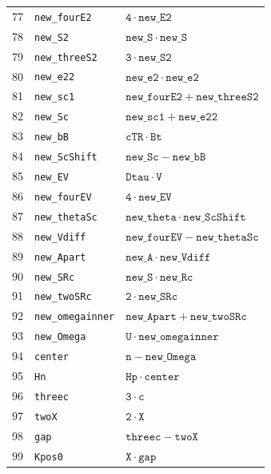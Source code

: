 \documentclass[11pt]{article}
\theoremstyle{remark}
\begin{document}
\begin{longtable}{rll}
77 & \texttt{new\_fourE2} & $\mathtt{4} \mathbin{\cdot} \mathtt{new\_E2}$ \\
78 & \texttt{new\_S2} & $\mathtt{new\_S} \mathbin{\cdot} \mathtt{new\_S}$ \\
79 & \texttt{new\_threeS2} & $\mathtt{3} \mathbin{\cdot} \mathtt{new\_S2}$ \\
80 & \texttt{new\_e22} & $\mathtt{new\_e2} \mathbin{\cdot} \mathtt{new\_e2}$ \\
81 & \texttt{new\_sc1} & $\mathtt{new\_fourE2} + \mathtt{new\_threeS2}$ \\
82 & \texttt{new\_Sc} & $\mathtt{new\_sc1} + \mathtt{new\_e22}$ \\
83 & \texttt{new\_bB} & $\mathtt{cTR} \mathbin{\cdot} \mathtt{Bt}$ \\
84 & \texttt{new\_ScShift} & $\mathtt{new\_Sc} - \mathtt{new\_bB}$ \\
85 & \texttt{new\_EV} & $\mathtt{Dtau} \mathbin{\cdot} \mathtt{V}$ \\
86 & \texttt{new\_fourEV} & $\mathtt{4} \mathbin{\cdot} \mathtt{new\_EV}$ \\
87 & \texttt{new\_thetaSc} & $\mathtt{new\_theta} \mathbin{\cdot} \mathtt{new\_ScShift}$ \\
88 & \texttt{new\_Vdiff} & $\mathtt{new\_fourEV} - \mathtt{new\_thetaSc}$ \\
89 & \texttt{new\_Apart} & $\mathtt{new\_A} \mathbin{\cdot} \mathtt{new\_Vdiff}$ \\
90 & \texttt{new\_SRc} & $\mathtt{new\_S} \mathbin{\cdot} \mathtt{new\_Rc}$ \\
91 & \texttt{new\_twoSRc} & $\mathtt{2} \mathbin{\cdot} \mathtt{new\_SRc}$ \\
92 & \texttt{new\_omegainner} & $\mathtt{new\_Apart} + \mathtt{new\_twoSRc}$ \\
93 & \texttt{new\_Omega} & $\mathtt{U} \mathbin{\cdot} \mathtt{new\_omegainner}$ \\
94 & \texttt{center} & $\mathtt{n} - \mathtt{new\_Omega}$ \\
95 & \texttt{Hn} & $\mathtt{Hp} \mathbin{\cdot} \mathtt{center}$ \\
96 & \texttt{threec} & $\mathtt{3} \mathbin{\cdot} \mathtt{c}$ \\
97 & \texttt{twoX} & $\mathtt{2} \mathbin{\cdot} \mathtt{X}$ \\
98 & \texttt{gap} & $\mathtt{threec} - \mathtt{twoX}$ \\
99 & \texttt{Kpos0} & $\mathtt{X} \mathbin{\cdot} \mathtt{gap}$ \\

\end{longtable}
\end{document}
